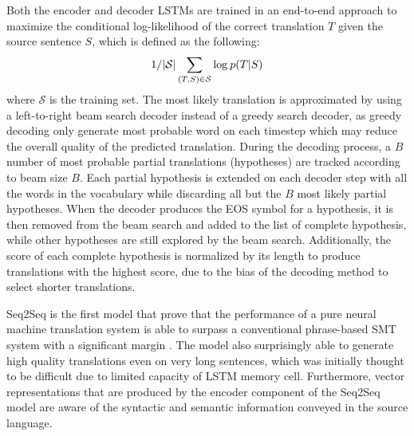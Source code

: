 \documentclass[12pt]{extarticle}
\begin{document}
Both the encoder and decoder LSTMs are trained in an end-to-end approach to maximize the conditional log-likelihood of the correct translation $T$ given the source sentence $S$, which is defined as the following:
\begin{align}
1/ |\mathcal{S}| \sum_{(T,S) \in \mathcal{S}} \textnormal{log}\: p(T|S)
\end{align}
where $\mathcal{S}$ is the training set. The most likely translation is approximated by using a left-to-right beam search decoder instead of a greedy search decoder, as greedy decoding only generate most probable word on each timestep which may reduce the overall quality of the predicted translation. During the decoding process, a $B$ number of most probable partial translations (hypotheses) are tracked according to beam size $B$. Each partial hypothesis is extended on each decoder step with all the words in the vocabulary while discarding all but the $B$ most likely partial hypotheses. When the decoder produces the EOS symbol for a hypothesis, it is then removed from the beam search and added to the list of complete hypothesis, while other hypotheses are still explored by the beam search. Additionally, the score of each complete hypothesis is normalized by its length to produce translations with the highest score, due to the bias of the decoding method to select shorter translations.

Seq2Seq is the first model that prove that the performance of a pure neural machine translation system is able to surpass a conventional phrase-based SMT system with a significant margin \citep{Sutskever:2014:SSL:2969033.2969173}. The model also surprisingly able to generate high quality translations even on very long sentences, which was initially thought to be difficult due to limited capacity of LSTM memory cell. Furthermore, vector representations that are produced by the encoder component of the Seq2Seq model are aware of the syntactic and semantic information conveyed in the source language.  
\end{document}

